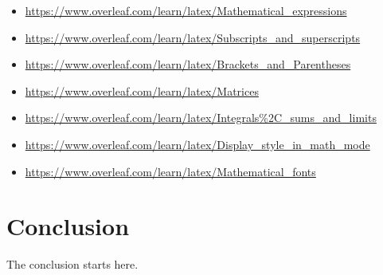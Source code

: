 \small

\begin{itemize}
\item
\url{https://www.overleaf.com/learn/latex/Mathematical_expressions}
\item
\url{https://www.overleaf.com/learn/latex/Subscripts_and_superscripts}
\item
\url{https://www.overleaf.com/learn/latex/Brackets_and_Parentheses}
\item
\url{https://www.overleaf.com/learn/latex/Matrices}
\item
\url{https://www.overleaf.com/learn/latex/Integrals\%2C_sums_and_limits}
\item
\url{https://www.overleaf.com/learn/latex/Display_style_in_math_mode}
\item
\url{https://www.overleaf.com/learn/latex/Mathematical_fonts}
\end{itemize}

\normalsize




\chapter{Conclusion}\label{chap:conclusion}
The conclusion starts here.
